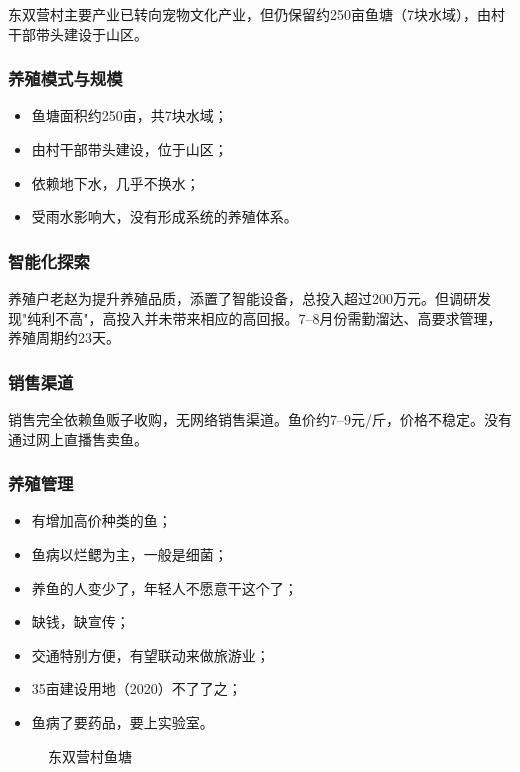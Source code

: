 \documentclass[12pt,a4paper]{article}
\begin{document}
东双营村主要产业已转向宠物文化产业，但仍保留约250亩鱼塘（7块水域），由村干部带头建设于山区。

\subsubsection{养殖模式与规模}

\begin{itemize}[leftmargin=2em]
    \item 鱼塘面积约250亩，共7块水域；
    \item 由村干部带头建设，位于山区；
    \item 依赖地下水，几乎不换水；
    \item 受雨水影响大，没有形成系统的养殖体系。
\end{itemize}

\subsubsection{智能化探索}

养殖户老赵为提升养殖品质，添置了智能设备，总投入超过200万元。但调研发现"纯利不高"，高投入并未带来相应的高回报。7--8月份需勤溜达、高要求管理，养殖周期约23天。

\subsubsection{销售渠道}

销售完全依赖鱼贩子收购，无网络销售渠道。鱼价约7--9元/斤，价格不稳定。没有通过网上直播售卖鱼。

\subsubsection{养殖管理}

\begin{itemize}[leftmargin=2em]
    \item 有增加高价种类的鱼；
    \item 鱼病以烂鳃为主，一般是细菌；
    \item 养鱼的人变少了，年轻人不愿意干这个了；
    \item 缺钱，缺宣传；
    \item 交通特别方便，有望联动来做旅游业；
    \item 35亩建设用地（2020）不了了之；
    \item 鱼病了要药品，要上实验室。
\end{itemize}

\begin{figure}[H]
\centering
{}
\caption{东双营村鱼塘}
\end{figure}
\end{document}
